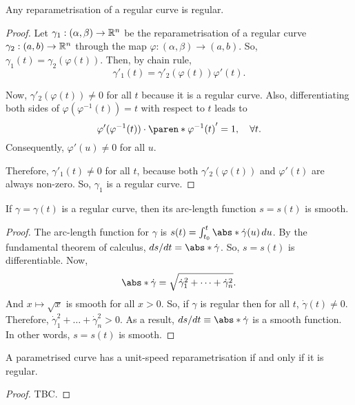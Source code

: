 \documentclass[11pt]{penrose}
\begin{document}
\begin{nthm}
    Any reparametrisation of a regular curve is regular.
\end{nthm}
\begin{proof}
    Let $\gamma_1 : (\alpha, \beta) \to \mathbb{R}^n$ be the reparametrisation of a regular curve $\gamma_2 : (a,b) \to \mathbb{R}^n$ through the map $\varphi : (\alpha, \beta) \to (a, b)$. So, $\gamma_1 (t) = \gamma_2 (\varphi(t))$. Then, by chain rule,
    \begin{equation}
        \gamma'_1 (t) = \gamma'_2 (\varphi(t)) \varphi'(t).
    \end{equation}

    Now, $\gamma'_2 (\varphi(t)) \neq 0$ for all $t$ because it is a regular curve. Also, differentiating both sides of $\varphi (\varphi^{-1} (t)) = t$ with respect to $t$ leads to
    \begin{equation}
        \varphi' (\varphi^{-1} (t)) \cdot \paren*{\varphi^{-1} (t)}' = 1, \quad\forall t.
    \end{equation}
    Consequently, $\varphi' (u) \neq 0$ for all $u$.

    Therefore, $\gamma'_1 (t) \neq 0$ for all $t$, because both $\gamma'_2 (\varphi(t))$ and $\varphi'(t)$ are always non-zero. So, $\gamma_1$ is a regular curve.
\end{proof}

\begin{nthm}
    If $\gamma = \gamma(t)$ is a regular curve, then its arc-length function $s = s(t)$ is smooth.
\end{nthm}
\begin{proof}
    The arc-length function for $\gamma$ is $s(t) = \int_{t_0}^{t} \abs*{\dot{\gamma}(u)} \,du$. By the fundamental theorem of calculus, $ds/dt = \abs*{\dot{\gamma}}$. So, $s = s(t)$ is differentiable. Now,
    \begin{equation}
        \abs*{\dot{\gamma}} = \sqrt{\dot{\gamma}_1^2 + \dots + \dot{\gamma}_n^2}.
    \end{equation}
    And $x \mapsto \sqrt{x}$ is smooth for all $x > 0$. So, if $\gamma$ is regular then for all $t$, $\dot{\gamma}(t) \neq 0$. Therefore, $\dot{\gamma}_1^2 + \dots + \dot{\gamma}_n^2 > 0$. As a result, $ds/dt \equiv \abs*{\dot{\gamma}}$ is a smooth function. In other words, $s = s(t)$ is smooth.
\end{proof}

\begin{nthm}
    A parametrised curve has a unit-speed reparametrisation if and only if it is regular.
\end{nthm}
\begin{proof}
    TBC.
\end{proof}
\end{document}
